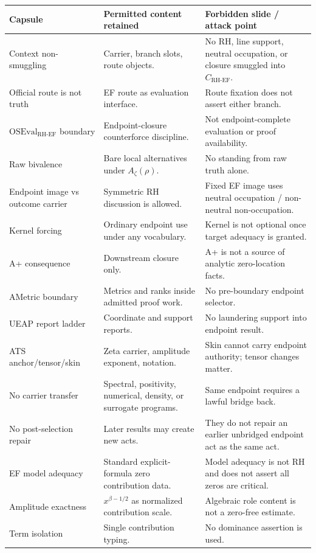 \documentclass[11pt]{article}
\newcommand{\Az}{A_{\zeta}}
\newcommand{\CRHEF}{C_{\mathrm{RH}\text{-}\mathrm{EF}}}
\newcommand{\OSEvalEF}{\mathrm{OSEval}_{\mathrm{RH}\text{-}\mathrm{EF}}}
\begin{document}
\begingroup\small
\begin{longtable}{L{0.23\textwidth}L{0.34\textwidth}L{0.33\textwidth}}
\toprule
\textbf{Capsule} & \textbf{Permitted content retained} & \textbf{Forbidden slide / attack point}\\
\midrule
Context non-smuggling & Carrier, branch slots, route objects. & No RH, line support, neutral occupation, or closure smuggled into \(\CRHEF\).\\
Official route is not truth & EF route as evaluation interface. & Route fixation does not assert either branch.\\
\(\OSEvalEF\) boundary & Endpoint-closure counterforce discipline. & Not endpoint-complete evaluation or proof availability.\\
Raw bivalence & Bare local alternatives under \(\Az(\rho)\). & No standing from raw truth alone.\\
Endpoint image vs outcome carrier & Symmetric RH discussion is allowed. & Fixed EF image uses neutral occupation / non-neutral non-occupation.\\
Kernel forcing & Ordinary endpoint use under any vocabulary. & Kernel is not optional once target adequacy is granted.\\
A+ consequence & Downstream closure only. & A+ is not a source of analytic zero-location facts.\\
AMetric boundary & Metrics and ranks inside admitted proof work. & No pre-boundary endpoint selector.\\
UEAP report ladder & Coordinate and support reports. & No laundering support into endpoint result.\\
ATS anchor/tensor/skin & Zeta carrier, amplitude exponent, notation. & Skin cannot carry endpoint authority; tensor changes matter.\\
No carrier transfer & Spectral, positivity, numerical, density, or surrogate programs. & Same endpoint requires a lawful bridge back.\\
No post-selection repair & Later results may create new acts. & They do not repair an earlier unbridged endpoint act as the same act.\\
EF model adequacy & Standard explicit-formula zero contribution data. & Model adequacy is not RH and does not assert all zeros are critical.\\
Amplitude exactness & \(x^{\beta-1/2}\) as normalized contribution scale. & Algebraic role content is not a zero-free estimate.\\
Term isolation & Single contribution typing. & No dominance assertion is used.\\

\end{longtable}
\end{document}
